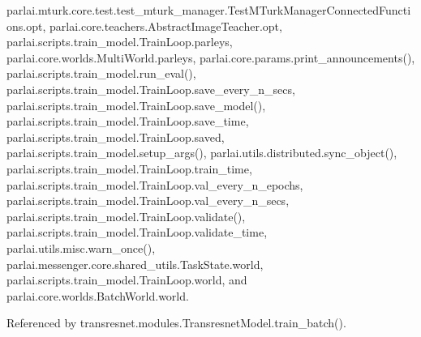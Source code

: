 parlai.\+mturk.\+core.\+test.\+test\+\_\+mturk\+\_\+manager.\+Test\+M\+Turk\+Manager\+Connected\+Functions.\+opt, parlai.\+core.\+teachers.\+Abstract\+Image\+Teacher.\+opt, parlai.\+scripts.\+train\+\_\+model.\+Train\+Loop.\+parleys, parlai.\+core.\+worlds.\+Multi\+World.\+parleys, parlai.\+core.\+params.\+print\+\_\+announcements(), parlai.\+scripts.\+train\+\_\+model.\+run\+\_\+eval(), parlai.\+scripts.\+train\+\_\+model.\+Train\+Loop.\+save\+\_\+every\+\_\+n\+\_\+secs, parlai.\+scripts.\+train\+\_\+model.\+Train\+Loop.\+save\+\_\+model(), parlai.\+scripts.\+train\+\_\+model.\+Train\+Loop.\+save\+\_\+time, parlai.\+scripts.\+train\+\_\+model.\+Train\+Loop.\+saved, parlai.\+scripts.\+train\+\_\+model.\+setup\+\_\+args(), parlai.\+utils.\+distributed.\+sync\+\_\+object(), parlai.\+scripts.\+train\+\_\+model.\+Train\+Loop.\+train\+\_\+time, parlai.\+scripts.\+train\+\_\+model.\+Train\+Loop.\+val\+\_\+every\+\_\+n\+\_\+epochs, parlai.\+scripts.\+train\+\_\+model.\+Train\+Loop.\+val\+\_\+every\+\_\+n\+\_\+secs, parlai.\+scripts.\+train\+\_\+model.\+Train\+Loop.\+validate(), parlai.\+scripts.\+train\+\_\+model.\+Train\+Loop.\+validate\+\_\+time, parlai.\+utils.\+misc.\+warn\+\_\+once(), parlai.\+messenger.\+core.\+shared\+\_\+utils.\+Task\+State.\+world, parlai.\+scripts.\+train\+\_\+model.\+Train\+Loop.\+world, and parlai.\+core.\+worlds.\+Batch\+World.\+world.



Referenced by transresnet.\+modules.\+Transresnet\+Model.\+train\+\_\+batch().

